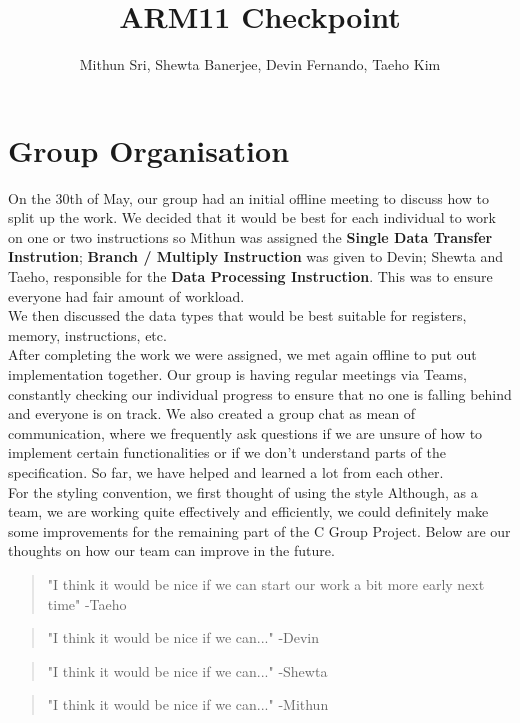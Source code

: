 \documentclass[11pt]{article}
\begin{document}
\title{ARM11 Checkpoint}
\author{Mithun Sri, Shewta Banerjee, Devin Fernando, Taeho Kim}

\maketitle

\section{Group Organisation}


\-\hspace{1cm}On the 30th of May, our group had an initial offline meeting to discuss how to split up the work. We decided that it would be best for each individual to work on one or two instructions so Mithun was assigned the {\bf Single Data Transfer Instrution}; {\bf Branch / Multiply Instruction} was given to Devin; Shewta and Taeho, responsible for the {\bf Data Processing Instruction}. This was to ensure everyone had fair amount of workload. \\
\-\hspace{1cm}We then discussed the data types that would be best suitable for registers, memory, instructions, etc. \\
\-\hspace{1cm}After completing the work we were assigned, we met again offline to put out implementation together.
\-\hspace{1cm}Our group is having regular meetings via Teams, constantly checking our individual progress to ensure that no one is falling behind and everyone is on track. We also created a group chat as mean of communication, where we frequently ask questions if we are unsure of how to implement certain functionalities or if we don't understand parts of the specification. So far, we have helped and learned a lot from each other.\\
\-\hspace{1cm}For the styling convention, we first thought of using the style 
\-\hspace{1cm}Although, as a team, we are working quite effectively and efficiently, we could definitely make some improvements for the remaining part of the C Group Project. Below are our thoughts on how our team can improve in the future.

\begin{quote}
  "I think it would be nice if we can start our work a bit more early next time" -Taeho
\end{quote}
\begin{quote}
  "I think it would be nice if we can..." -Devin
\end{quote}
\begin{quote}
  "I think it would be nice if we can..." -Shewta
\end{quote}
\begin{quote}
  "I think it would be nice if we can..." -Mithun
\end{quote}
\end{document}
